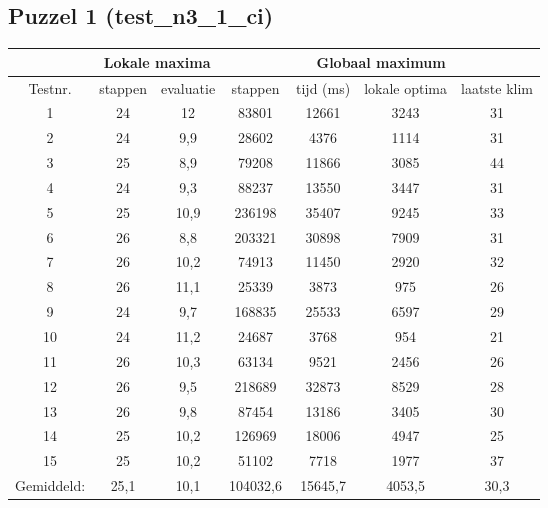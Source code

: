 \documentclass[]{report}
\begin{document}
\begin{appendices}
\subsection{Puzzel 1 (test\_n3\_1\_ci)}
\begin{tabular}{|c||c|c||c|c|c|c|}
\hline  & \multicolumn{2}{|c||}{Lokale maxima} & \multicolumn{4}{|c|}{Globaal maximum}  \\ 
\hline Testnr. & stappen & evaluatie & stappen & tijd (ms) & lokale optima & laatste klim \\ 
\hline \hline 1 & 24 & 12 & 83801 & 12661 & 3243 & 31 \\ 
\hline 2 & 24 & 9,9 & 28602 & 4376 & 1114 & 31 \\ 
\hline 3 & 25 & 8,9 & 79208 & 11866 & 3085 & 44 \\ 
\hline 4 & 24 & 9,3 & 88237 & 13550 & 3447 & 31 \\ 
\hline 5 & 25 & 10,9 & 236198 & 35407 & 9245 & 33 \\ 
\hline	6	&	26	&	8,8	&	203321	&	30898	&	7909	&	31	\\
\hline	7	&	26	&	10,2	&	74913	&	11450	&	2920	&	32	\\
\hline	8	&	26	&	11,1	&	25339	&	3873	&	975	&	26	\\
\hline	9	&	24	&	9,7	&	168835	&	25533	&	6597	&	29	\\
\hline	10	&	24	&	11,2	&	24687	&	3768	&	954	&	21	\\
\hline	11	&	26	&	10,3	&	63134	&	9521	&	2456	&	26	\\
\hline	12	&	26	&	9,5	&	218689	&	32873	&	8529	&	28	\\
\hline	13	&	26	&	9,8	&	87454	&	13186	&	3405	&	30	\\
\hline	14	&	25	&	10,2	&	126969	&	18006	&	4947	&	25	\\
\hline	15	&	25	&	10,2	&	51102	&	7718	&	1977	&	37	\\
\hline \hline Gemiddeld: & 25,1 & 10,1 & 104032,6 & 15645,7 & 4053,5 & 30,3 \\ 
\hline 
\end{tabular} 

\end{appendices}
\end{document}
